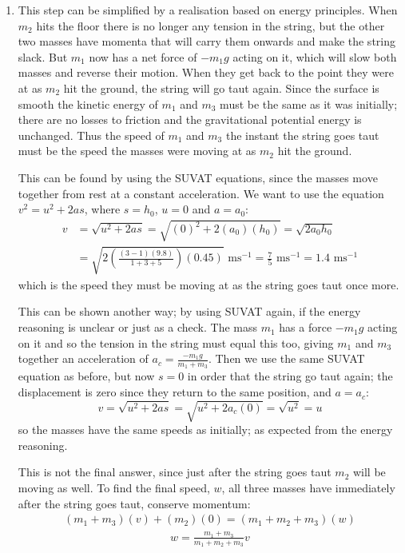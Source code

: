 \begin{problem}[A1969AMIIQ2a]
{\begin{enumerate}
\begin{enumerate}
		\item This step can be simplified by a realisation based on energy principles. When $m_{2}$ hits the floor there is no longer any tension in the string, but the other two masses have momenta that will carry them onwards and make the string slack. But $m_{1}$ now has a net force of $-m_{1}g$ acting on it, which will slow both masses and reverse their motion. When they get back to the point they were at as $m_{2}$ hit the ground, the string will go taut again. Since the surface is smooth the kinetic energy of $m_{1}$ and $m_{3}$ must be the same as it was initially; there are no losses to friction and the gravitational potential energy is unchanged. Thus the speed of $m_{1}$ and $m_{3}$ the instant the string goes taut must be the speed the masses were moving at as $m_{2}$ hit the ground.

This can be found by using the SUVAT equations, since the masses move together from rest at a constant acceleration. We want to use the equation $v^{2} = u^{2} + 2as$, where $s = h_{0}$, $u = 0$ and $a = a_{0}$:
\begin{align*} 
v &= \sqrt{u^{2} + 2as} = \sqrt{(0)^{2} + 2(a_{0})(h_{0})} = \sqrt{2a_{0}h_{0}} \\
 &= \sqrt{2\left(\frac{(3 - 1)(9.8)}{1 + 3 + 5}\right)(0.45)} \text{ ms}^{-1} = \frac{7}{5} \text{ ms}^{-1} = 1.4 \text{ ms}^{-1}  
 \end{align*}
which is the speed they must be moving at as the string goes taut once more. 

This can be shown another way; by using SUVAT again, if the energy reasoning is unclear or just as a check. The mass $m_{1}$ has a force $-m_{1}g$ acting on it and so the tension in the string must equal this too, giving $m_{1}$ and $m_{3}$ together an acceleration of $a_{c} = \frac{-m_{1}g}{m_{1} + m_{3}}$. Then we use the same SUVAT equation as before, but now $s = 0$ in order that the string go taut again; the displacement is zero since they return to the same position, and $a = a_{c}$:
\begin{equation*} 
v = \sqrt{u^{2} + 2as} = \sqrt{u^{2} + 2a_{c}(0)} = \sqrt{u^{2}} = u 
\end{equation*}
so the masses have the same speeds as initially; as expected from the energy reasoning.

This is not the final answer, since just after the string goes taut $m_{2}$ will be moving as well. To find the final speed, $w$, all three masses have immediately after the string goes taut, conserve momentum:
\begin{align*} 
(m_{1} + m_{3})(v) + (m_{2})(0) = (m_{1} + m_{2} + m_{3})(w) 
\end{align*}
\begin{align*}
 w = \frac{m_{1} + m_{3}}{m_{1} + m_{2} + m_{3}} v 
 \end{align*}


\end{enumerate}
\end{enumerate}}
\end{problem}
